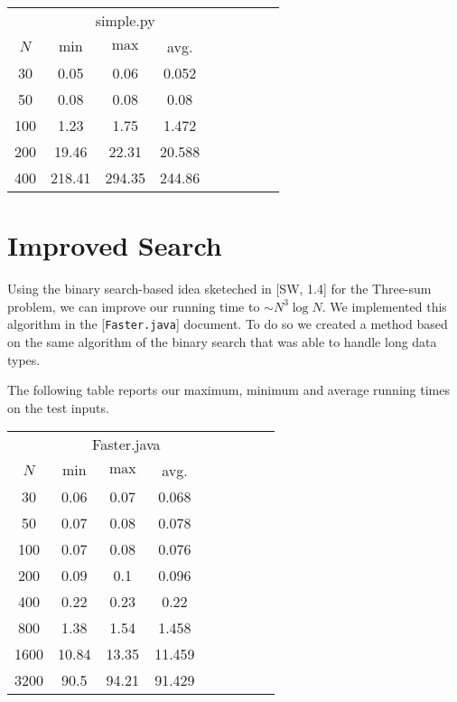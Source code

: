 \documentclass{tufte-handout}
\begin{document}
\bigskip\noindent
{ \small
  \begin{tabular}{cccccccc}
  \toprule
& \multicolumn{3}{c}{simple.py} & $\quad$    \\\cmidrule{2-4} \cmidrule{6-8}
  $N$     & $\min$     & $\max$ & avg.  \\\midrule
  30 &  0.05 & 0.06 & 0.052  \\
  50 &  0.08 & 0.08 & 0.08  \\
  100 &  1.23 & 1.75 & 1.472  \\
  200 &  19.46 & 22.31 & 20.588  \\
  400 &  218.41 & 294.35 & 244.86  \\
  \bottomrule
  \end{tabular}
}

\bigskip

\section{Improved Search}
Using the binary search-based idea sketeched in [SW, 1.4] for the Three-sum problem, we can improve our running time to $\sim N^3\log N$.
We implemented this algorithm in the [\texttt{Faster.java}] document. To do so we created a method based on the same algorithm of the binary search that was able to handle long data types.

\bigskip

The following table reports our maximum, minimum and average running times on the test inputs.

\bigskip\noindent
{ \small
  \begin{tabular}{cccccccc}
  \toprule
& \multicolumn{3}{c}{Faster.java} & $\quad$    \\\cmidrule{2-4} \cmidrule{6-8}
  $N$     & $\min$     & $\max$ & avg.  \\\midrule
  30 & 0.06 & 0.07 & 0.068 \\
  50 & 0.07 & 0.08 & 0.078 \\
  100 & 0.07 & 0.08 & 0.076 \\
  200 & 0.09 & 0.1 & 0.096 \\
  400 & 0.22 & 0.23 & 0.22 \\
  800 & 1.38 & 1.54 & 1.458 \\
  1600 & 10.84 & 13.35 & 11.459 \\
  3200 & 90.5 & 94.21 & 91.429 \\
  \bottomrule
  \end{tabular}
}

\newpage
\end{document}
